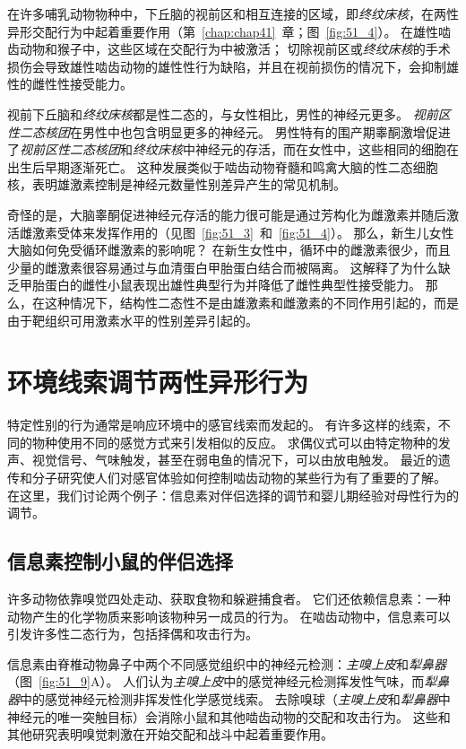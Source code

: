 在许多哺乳动物物种中，下丘脑的视前区和相互连接的区域，即\textit{终纹床核}，在两性异形交配行为中起着重要作用（第~\ref{chap:chap41}~章；图~\ref{fig:51_4}）。
在雄性啮齿动物和猴子中，这些区域在交配行为中被激活；
切除视前区或\textit{终纹床核}的手术损伤会导致雄性啮齿动物的雄性性行为缺陷，并且在视前损伤的情况下，会抑制雄性的雌性性接受能力。


视前下丘脑和\textit{终纹床核}都是性二态的，与女性相比，男性的神经元更多。
\textit{视前区性二态核团}在男性中也包含明显更多的神经元。
男性特有的围产期睾酮激增促进了\textit{视前区性二态核团}和\textit{终纹床核}中神经元的存活，而在女性中，这些相同的细胞在出生后早期逐渐死亡。
这种发展类似于啮齿动物脊髓和鸣禽大脑的性二态细胞核，表明雄激素控制是神经元数量性别差异产生的常见机制。


奇怪的是，大脑睾酮促进神经元存活的能力很可能是通过芳构化为雌激素并随后激活雌激素受体来发挥作用的（见图~\ref{fig:51_3}~和~\ref{fig:51_4}）。
那么，新生儿女性大脑如何免受循环雌激素的影响呢？
在新生女性中，循环中的雌激素很少，而且少量的雌激素很容易通过与血清蛋白甲胎蛋白结合而被隔离。
这解释了为什么缺乏甲胎蛋白的雌性小鼠表现出雄性典型行为并降低了雌性典型性接受能力。
那么，在这种情况下，结构性二态性不是由雄激素和雌激素的不同作用引起的，而是由于靶组织可用激素水平的性别差异引起的。



\section{环境线索调节两性异形行为}

特定性别的行为通常是响应环境中的感官线索而发起的。
有许多这样的线索，不同的物种使用不同的感觉方式来引发相似的反应。
求偶仪式可以由特定物种的发声、视觉信号、气味触发，甚至在弱电鱼的情况下，可以由放电触发。
最近的遗传和分子研究使人们对感官体验如何控制啮齿动物的某些行为有了重要的了解。
在这里，我们讨论两个例子：信息素对伴侣选择的调节和婴儿期经验对母性行为的调节。



\subsection{信息素控制小鼠的伴侣选择}
许多动物依靠嗅觉四处走动、获取食物和躲避捕食者。
它们还依赖信息素：一种动物产生的化学物质来影响该物种另一成员的行为。
在啮齿动物中，信息素可以引发许多性二态行为，包括择偶和攻击行为。


信息素由脊椎动物鼻子中两个不同感觉组织中的神经元检测：\textit{主嗅上皮}和\textit{犁鼻器}（图~\ref{fig:51_9}A）。
人们认为\textit{主嗅上皮}中的感觉神经元检测挥发性气味，而\textit{犁鼻器}中的感觉神经元检测非挥发性化学感觉线索。
去除嗅球（\textit{主嗅上皮}和\textit{犁鼻器}中神经元的唯一突触目标）会消除小鼠和其他啮齿动物的交配和攻击行为。
这些和其他研究表明嗅觉刺激在开始交配和战斗中起着重要作用。


